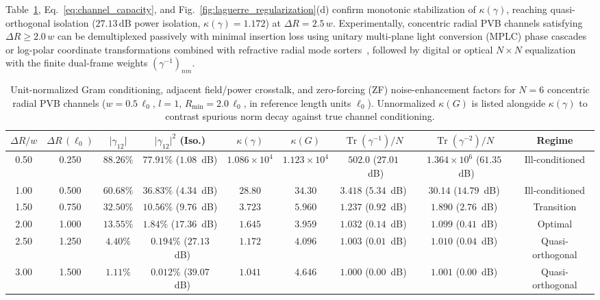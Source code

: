 \documentclass[aps,pra,reprint,amsmath,amssymb,floatfix,longbibliography]{revtex4-2}
\providecommand{\abs}[1]{\lvert#1\rvert}
\begin{document}
Table~\ref{tab:gram_matrix}, Eq.~\eqref{eq:channel_capacity}, and Fig.~\ref{fig:laguerre_regularization}(d) confirm monotonic stabilization of $\kappa(\gamma)$, reaching quasi-orthogonal isolation ($27.13\,\mathrm{dB}$ power isolation, $\kappa(\gamma) = 1.172$) at $\Delta R = 2.5\,w$. Experimentally, concentric radial PVB channels satisfying $\Delta R \ge 2.0\,w$ can be demultiplexed passively with minimal insertion loss using unitary multi-plane light conversion (MPLC) phase cascades~\cite{Fontaine2019} or log-polar coordinate transformations combined with refractive radial mode sorters~\cite{Berkhout2010,Bouchard2018}, followed by digital or optical $N \times N$ equalization with the finite dual-frame weights $(\gamma^{-1})_{nm}$.

\begin{table}[t]
\caption{Unit-normalized Gram conditioning, adjacent field/power crosstalk, and zero-forcing (ZF) noise-enhancement factors for $N = 6$ concentric radial PVB channels ($w = 0.5\,\ell_0$, $l = 1$, $R_{\min} = 2.0\,\ell_0$, in reference length units $\ell_0$). Unnormalized $\kappa(G)$ is listed alongside $\kappa(\gamma)$ to contrast spurious norm decay against true channel conditioning.}
\label{tab:gram_matrix}
\begin{ruledtabular}
\footnotesize
\setlength{\tabcolsep}{2.5pt}
\begin{tabular}{ccccccccc}
$\Delta R / w$ & $\Delta R\,(\ell_0)$ & $\abs{\gamma_{12}}$ & $\abs{\gamma_{12}}^2$ (Iso.) & $\kappa(\gamma)$ & $\kappa(G)$ & $\operatorname{Tr}(\gamma^{-1})/N$ & $\operatorname{Tr}(\gamma^{-2})/N$ & Regime \\
\hline
0.50 & 0.250 & $88.26\%$ & $77.91\%$ ($1.08$~dB) & $1.086\times 10^4$ & $1.123\times 10^4$ & $502.0$ ($27.01$~dB) & $1.364\times 10^6$ ($61.35$~dB) & Ill-conditioned \\
1.00 & 0.500 & $60.68\%$ & $36.83\%$ ($4.34$~dB) & $28.80$ & $34.30$ & $3.418$ ($5.34$~dB) & $30.14$ ($14.79$~dB) & Ill-conditioned \\
1.50 & 0.750 & $32.50\%$ & $10.56\%$ ($9.76$~dB) & $3.723$ & $5.960$ & $1.237$ ($0.92$~dB) & $1.890$ ($2.76$~dB) & Transition \\
2.00 & 1.000 & $13.55\%$ & $1.84\%$ ($17.36$~dB) & $1.645$ & $3.959$ & $1.032$ ($0.14$~dB) & $1.099$ ($0.41$~dB) & Optimal \\
2.50 & 1.250 & $4.40\%$ & $0.194\%$ ($27.13$~dB) & $1.172$ & $4.096$ & $1.003$ ($0.01$~dB) & $1.010$ ($0.04$~dB) & Quasi-orthogonal \\
3.00 & 1.500 & $1.11\%$ & $0.012\%$ ($39.07$~dB) & $1.041$ & $4.646$ & $1.000$ ($0.00$~dB) & $1.001$ ($0.00$~dB) & Quasi-orthogonal \\
\end{tabular}
\end{ruledtabular}
\end{table}
\end{document}
